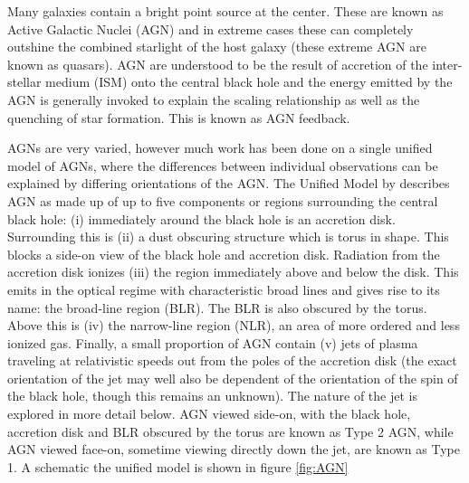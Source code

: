 Many galaxies contain a bright point source at the center. These are known as Active Galactic Nuclei (AGN) and in extreme cases these can completely outshine the combined starlight of the host galaxy (these extreme AGN are known as quasars). AGN are understood to be the result of accretion of the inter-stellar medium (ISM) onto the central black hole and the energy emitted by the AGN is generally invoked to explain the scaling relationship as well as the quenching of star formation. This is known as AGN feedback. 

AGNs are very varied, however much work has been done on a single unified model of AGNs, where the differences between individual observations can be explained by differing orientations of the AGN. The Unified Model by \citet{Antonucci1993} describes AGN as made up of up to five components or regions surrounding the central black hole: (i) immediately around the black hole is an accretion disk. Surrounding this is (ii) a dust obscuring structure which is torus in shape. This blocks a side-on view of the black hole and accretion disk. Radiation from the accretion disk ionizes (iii) the region immediately above and below the disk. This emits in the optical regime with characteristic broad lines and gives rise to its name: the broad-line region (BLR). The BLR is also obscured by the torus. Above this is (iv) the narrow-line region (NLR), an area of more ordered and less ionized gas. Finally, a small proportion of AGN contain (v) jets of plasma traveling at relativistic speeds out from the poles of the accretion disk (the exact orientation of the jet may well also be dependent of the orientation of the spin of the black hole, though this remains an unknown). The nature of the jet is explored in more detail below. AGN viewed side-on, with the black hole, accretion disk and BLR obscured by the torus are known as Type 2 AGN, while AGN viewed face-on, sometime viewing directly down the jet, are known as Type 1. A schematic the unified model is shown in figure \ref{fig:AGN}

